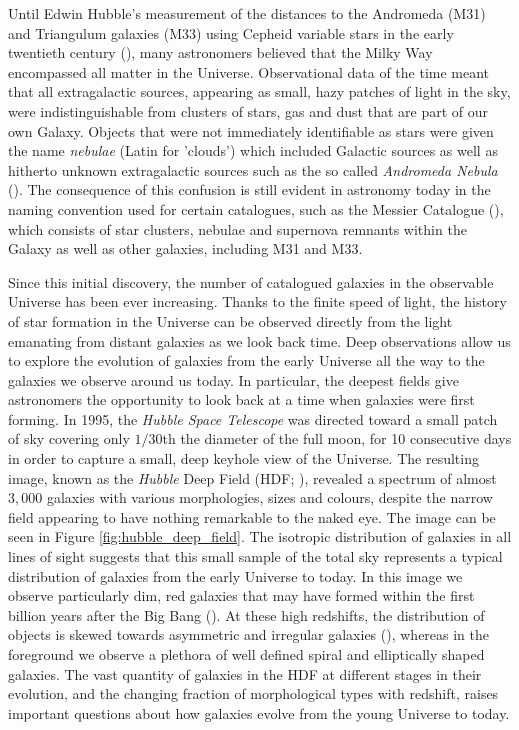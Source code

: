 \sloppy

Until Edwin Hubble's measurement of the distances to the Andromeda (M31) and Triangulum galaxies (M33) using Cepheid variable stars in the early twentieth century (\citealt{Hubble_1925}), many astronomers believed that the Milky Way encompassed all matter in the Universe. Observational data of the time meant that all extragalactic sources, appearing as small, hazy patches of light in the sky, were indistinguishable from clusters of stars, gas and dust that are part of our own Galaxy. Objects that were not immediately identifiable as stars were given the name \textit{nebulae} (Latin for 'clouds') which included Galactic sources as well as hitherto unknown extragalactic sources such as the so called \textit{Andromeda Nebula} (\citealt{Herschel_1785}). The consequence of this confusion is still evident in astronomy today in the naming convention used for certain catalogues, such as the Messier Catalogue (\citealt{Messier_1771, Messier_1781}), which consists of star clusters, nebulae and supernova remnants within the Galaxy as well as other galaxies, including M31 and M33.

Since this initial discovery, the number of catalogued galaxies in the observable Universe has been ever increasing. Thanks to the finite speed of light, the history of star formation in the Universe can be observed directly from the light emanating from distant galaxies as we look back time. Deep observations allow us to explore the evolution of galaxies from the early Universe all the way to the galaxies we observe around us today. In particular, the deepest fields give astronomers the opportunity to look back at a time when galaxies were first forming. In 1995, the \textit{Hubble Space Telescope} was directed toward a small patch of sky covering only $1/30$th the diameter of the full moon, for 10 consecutive days in order to capture a small, deep keyhole view of the Universe. The resulting image, known as the \textit{Hubble} Deep Field (HDF; \citealt{Williams_1996, Ferguson_2000}), revealed a spectrum of almost $3,000$ galaxies with various morphologies, sizes and colours, despite the narrow field appearing to have nothing remarkable to the naked eye. The image can be seen in Figure \ref{fig:hubble_deep_field}. The isotropic distribution of galaxies in all lines of sight suggests that this small sample of the total sky represents a typical distribution of galaxies from the early Universe to today. In this image we observe particularly dim, red galaxies that may have formed within the first billion years after the Big Bang (\citealt{Madau_1996}). At these high redshifts, the distribution of objects is skewed towards asymmetric and irregular galaxies (\citealt{Abraham_1996}), whereas in the foreground we observe a plethora of well defined spiral and elliptically shaped galaxies. The vast quantity of galaxies in the HDF at different stages in their evolution, and the changing fraction of morphological types with redshift, raises important questions about how galaxies evolve from the young Universe to today.

